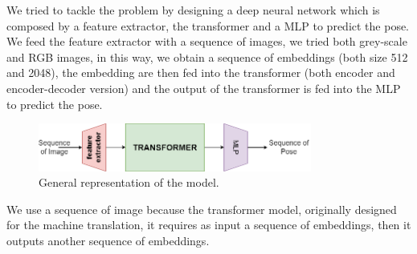We tried to tackle the problem by designing a deep neural network which is composed by a feature extractor, the transformer and a MLP to predict the pose.
We feed the feature extractor with a sequence of images, we tried both grey-scale and RGB images, in this way, we obtain a sequence of embeddings (both size 512 and 2048), the embedding are then fed into the transformer (both encoder and encoder-decoder version) and the output of the transformer is fed into the MLP to predict the pose.

\begin{figure}[H]
    \centering
    \includegraphics[width=0.8\textwidth]{images/1_4_general_solution}
    \caption{General representation of the model.}
    \label{fig:figure-1_4_solution}
\end{figure}

We use a sequence of image because the transformer model, originally designed for the machine translation, it requires as input a sequence of embeddings, then it outputs another sequence of embeddings.